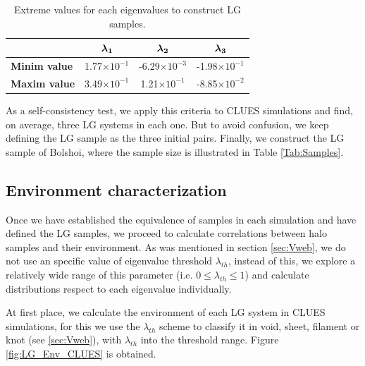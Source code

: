 \documentclass[usenatbib]{latex/mn2e}
\begin{document}
\begin{table}
  \centering
  \begin{tabular}{l | c c c} \hline
	& $\boldsymbol{ \lambda_{1} }$ & $\boldsymbol{ \lambda_{2} }$  & $\boldsymbol{ \lambda_{3} }$ \\ \hline
	\textbf{Minim value} & 1.77$\times 10^{-1}$ & -6.29$\times 10^{-3}$ & -1.98$\times 10^{-1}$ \\
	\textbf{Maxim value} & 3.49$\times 10^{-1}$ & 1.21$\times 10^{-1}$ & -8.85$\times 10^{-2}$ \\ \hline
  \end{tabular}
  
  \caption{Extreme values for each eigenvalues to construct LG samples.}
  
  \label{Tab:Lambdas_LG}
\end{table}


As a self-consistency test, we apply this criteria to CLUES simulations 
and find, on average, three LG systems in each one. But to avoid confusion, 
we keep defining the LG sample as the three initial pairs. Finally, we 
construct the LG sample of Bolshoi, where the sample size is illustrated 
in Table \ref{Tab:Samples}.


\subsection{Environment characterization}
\label{subsec:Env_characterization}


Once we have established the equivalence of samples in each simulation and 
have defined the LG samples, we proceed to calculate correlations between 
halo samples and their environment. As was mentioned in section 
\ref{sec:Vweb}, we do not use an specific value of eigenvalue threshold 
$\lambda_{th}$, instead of this, we explore a relatively wide range of 
this parameter (i.e. $0 \leq \lambda_{th} \leq 1$) and calculate 
distributions respect to each eigenvalue individually.


At first place, we calculate the environment of each LG system in CLUES 
simulations, for this we use the $\lambda_{th}$ scheme to classify it in 
void, sheet, filament or knot (see \ref{sec:Vweb}), with $\lambda_{th}$
into the threshold range. Figure \ref{fig:LG_Env_CLUES} is obtained.
\end{document}
